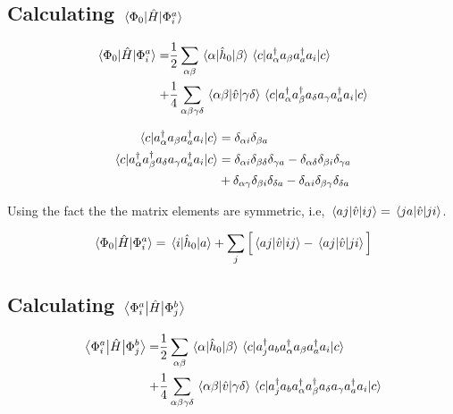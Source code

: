 \subsection{Calculating $\mel{\Phi_0}{\hat{H}}{\Phi_i^a}$}

\begin{align}
\mel{\Phi_0}{\hat{H}}{\Phi_i^a}
=&\frac{1}{2}\sum_{\alpha\beta}\mel{\alpha}{\hat{h}_0}{\beta}\mel{c}{a_{\alpha}^{\dagger}a_{\beta}a_a^{\dagger}a_i}{c}\\
+&\frac{1}{4}\sum_{\alpha\beta\gamma\delta}\mel{\alpha\beta}{\hat{v}}{\gamma\delta}\mel{c}{a_{\alpha}^{\dagger}a_{\beta}^{\dagger}a_{\delta}a_{\gamma}a_a^{\dagger}a_i}{c}\notag
\end{align}

\begin{align}
\mel{c}{a_{\alpha}^{\dagger}a_{\beta}a_a^{\dagger}a_i}{c}&=\delta_{\alpha i}\delta_{\beta a}\\
\mel{c}{a_{\alpha}^{\dagger}a_{\beta}^{\dagger}a_{\delta}a_{\gamma}a_a^{\dagger}a_i}{c}&=\delta_{\alpha i}\delta_{\beta\delta}\delta_{\gamma a}-\delta_{\alpha\delta}\delta_{\beta i}\delta_{\gamma a}\\
&+\delta_{\alpha\gamma}\delta_{\beta i}\delta_{\delta a}-\delta_{\alpha i}\delta_{\beta\gamma}\delta_{\delta a}
\end{align}

Using the fact the the matrix elements are symmetric, i.e, $\mel{aj}{\hat{v}}{ij}=\mel{ja}{\hat{v}}{ji}$. 

\begin{equation}
\mel{\Phi_0}{\hat{H}}{\Phi_i^a}=\mel{i}{\hat{h}_0}{a}+\sum_j\Big[\mel{aj}{\hat{v}}{ij}-\mel{aj}{\hat{v}}{ji}\Big]
\end{equation}

\subsection{Calculating $\mel{\Phi_i^a}{\hat{H}}{\Phi_j^b}$}
\begin{align}
\mel{\Phi_i^a}{\hat{H}}{\Phi_j^b}
=&\frac{1}{2}\sum_{\alpha\beta}\mel{\alpha}{\hat{h}_0}{\beta}\mel{c}{a_j^{\dagger}a_ba_{\alpha}^{\dagger}a_{\beta}a_a^{\dagger}a_i}{c}\\
+&\frac{1}{4}\sum_{\alpha\beta\gamma\delta}\mel{\alpha\beta}{\hat{v}}{\gamma\delta}\mel{c}{a_j^{\dagger}a_ba_{\alpha}^{\dagger}a_{\beta}^{\dagger}a_{\delta}a_{\gamma}a_a^{\dagger}a_i}{c}\notag
\end{align}

